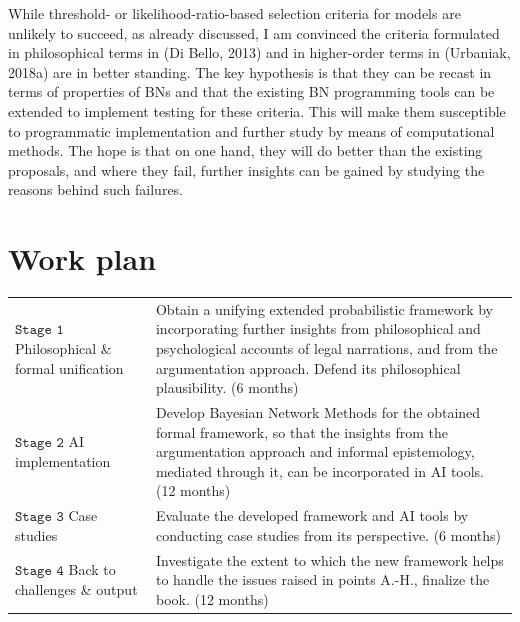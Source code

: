 \documentclass[11pt,dvipsnames,enabledeprecatedfontcommands]{scrartcl}
\begin{document}
While threshold- or likelihood-ratio-based selection criteria for models
are unlikely to succeed, as already discussed, I am convinced the
criteria formulated in philosophical terms in (Di Bello, 2013) and in
higher-order terms in (Urbaniak, 2018a) are in better standing. The key
hypothesis is that they can be recast in terms of properties of BNs and
that the existing BN programming tools can be extended to implement
testing for these criteria. This will make them susceptible to
programmatic implementation and further study by means of computational
methods. The hope is that on one hand, they will do better than the
existing proposals, and where they fail, further insights can be gained
by studying the reasons behind such failures.

\section{Work plan}\label{work-plan}

\vspace{1mm}

\begin{center}
\begin{tabular}{p{2.3cm}|p{12.2cm}}
\footnotesize \textbf{$\mathtt{Stage  \,\, 1}$} \newline  \tiny Philosophical \&  formal \newline  unification & 
Obtain a unifying extended  probabilistic framework by incorporating further insights  from philosophical and psychological accounts of legal narrations, and from the argumentation approach. Defend its philosophical plausibility. \scriptsize (6 months)
\\
\footnotesize \textbf{$\mathtt{Stage \,\, 2}$} \newline  \tiny AI implementation 
 & Develop Bayesian Network Methods for the obtained formal framework, so that the insights from the argumentation approach and informal epistemology, mediated through it, can be incorporated in AI tools. \scriptsize (12 months)
\\
\footnotesize \textbf{$\mathtt{Stage  \,\, 3}$} \newline  \tiny    Case studies & 
Evaluate the developed framework and AI tools  by conducting case studies from its perspective.    \scriptsize (6 months) 
\\
\footnotesize \textbf{$\mathtt{Stage  \,\, 4}$} \newline  \tiny    Back to challenges \& output & 
Investigate the extent to which the new framework helps to handle the issues raised in points A.-H., finalize the book. \scriptsize (12 months)
\end{tabular}
\end{center}
\end{document}
